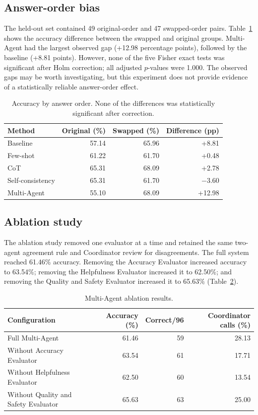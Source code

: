 \documentclass[10pt]{article}
\begin{document}
\subsection{Answer-order bias}
The held-out set contained 49 original-order and 47 swapped-order pairs. Table~\ref{tab:order} shows the accuracy difference between the swapped and original groups. Multi-Agent had the largest observed gap (+12.98 percentage points), followed by the baseline (+8.81 points). However, none of the five Fisher exact tests was significant after Holm correction; all adjusted $p$-values were 1.000. The observed gaps may be worth investigating, but this experiment does not provide evidence of a statistically reliable answer-order effect.

\begin{table}[ht]
\centering
\small
\begin{tabular}{@{}lrrr@{}}
\toprule
Method & Original (\%) & Swapped (\%) & Difference (pp) \\
\midrule
Baseline & 57.14 & 65.96 & +8.81 \\
Few-shot & 61.22 & 61.70 & +0.48 \\
CoT & 65.31 & 68.09 & +2.78 \\
Self-consistency & 65.31 & 61.70 & $-3.60$ \\
Multi-Agent & 55.10 & 68.09 & +12.98 \\
\bottomrule
\end{tabular}
\caption{Accuracy by answer order. None of the differences was statistically significant after correction.}
\label{tab:order}
\end{table}

\subsection{Ablation study}
The ablation study removed one evaluator at a time and retained the same two-agent agreement rule and Coordinator review for disagreements. The full system reached 61.46\% accuracy. Removing the Accuracy Evaluator increased accuracy to 63.54\%; removing the Helpfulness Evaluator increased it to 62.50\%; and removing the Quality and Safety Evaluator increased it to 65.63\% (Table~\ref{tab:ablation}).

\begin{table}[ht]
\centering
\small
\begin{tabular}{@{}lrrr@{}}
\toprule
Configuration & Accuracy (\%) & Correct/96 & Coordinator calls (\%) \\
\midrule
Full Multi-Agent & 61.46 & 59 & 28.13 \\
Without Accuracy Evaluator & 63.54 & 61 & 17.71 \\
Without Helpfulness Evaluator & 62.50 & 60 & 13.54 \\
Without Quality and Safety Evaluator & 65.63 & 63 & 25.00 \\
\bottomrule
\end{tabular}
\caption{Multi-Agent ablation results.}
\label{tab:ablation}
\end{table}
\end{document}

